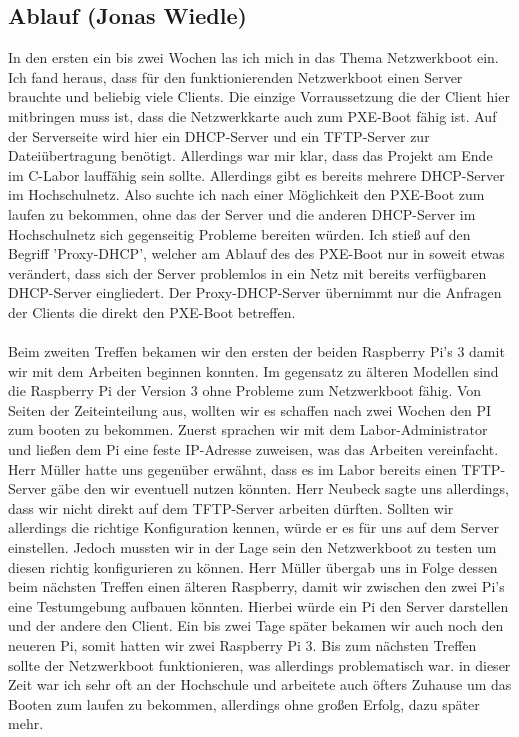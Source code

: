 \documentclass{article}
\begin{document}
\subsection{Ablauf (Jonas Wiedle)}
In den ersten ein bis zwei Wochen las ich mich in das Thema Netzwerkboot ein. Ich fand heraus, dass für den funktionierenden Netzwerkboot einen Server brauchte und beliebig viele Clients. Die einzige Vorraussetzung die der Client hier mitbringen muss ist, dass die Netzwerkkarte auch zum PXE-Boot fähig ist.
Auf der Serverseite wird hier ein DHCP-Server und ein TFTP-Server zur Dateiübertragung benötigt. Allerdings war mir klar, dass das Projekt am Ende im C-Labor lauffähig sein sollte. Allerdings gibt es bereits mehrere DHCP-Server im Hochschulnetz. Also suchte ich nach einer Möglichkeit den PXE-Boot zum laufen zu bekommen, ohne das der Server und die anderen DHCP-Server im Hochschulnetz sich gegenseitig Probleme bereiten würden. Ich stieß auf den Begriff  'Proxy-DHCP', welcher am Ablauf des des PXE-Boot nur in soweit etwas verändert, dass sich der Server problemlos in ein Netz mit bereits verfügbaren DHCP-Server eingliedert. Der Proxy-DHCP-Server übernimmt nur die Anfragen der Clients die direkt den PXE-Boot betreffen. 
\\\\
Beim zweiten Treffen bekamen wir den ersten der beiden Raspberry Pi's 3 damit wir mit dem Arbeiten beginnen konnten. Im gegensatz zu älteren Modellen sind die Raspberry Pi der Version 3 ohne Probleme zum Netzwerkboot fähig. Von Seiten der Zeiteinteilung aus, wollten wir es schaffen nach zwei Wochen den PI zum booten zu bekommen.
Zuerst sprachen wir mit dem Labor-Administrator und ließen dem Pi eine feste IP-Adresse zuweisen, was das Arbeiten vereinfacht. Herr Müller hatte uns gegenüber erwähnt, dass es im Labor bereits einen TFTP-Server gäbe den wir eventuell nutzen könnten. Herr Neubeck sagte uns allerdings, dass wir nicht direkt auf dem TFTP-Server arbeiten dürften.
Sollten wir allerdings die richtige Konfiguration kennen, würde er es für uns auf dem Server einstellen.
Jedoch mussten wir in der Lage sein den Netzwerkboot zu testen um diesen richtig konfigurieren zu können. Herr Müller übergab uns in Folge dessen beim nächsten Treffen einen älteren Raspberry, damit wir zwischen den zwei Pi's eine Testumgebung aufbauen könnten. Hierbei würde ein Pi den Server darstellen und der andere den Client.
Ein bis zwei Tage später bekamen wir auch noch den neueren Pi, somit hatten wir zwei Raspberry Pi 3. Bis zum nächsten Treffen sollte der Netzwerkboot funktionieren, was allerdings problematisch war. in dieser Zeit war ich sehr oft an der Hochschule und arbeitete auch öfters Zuhause um das Booten zum laufen zu bekommen, allerdings ohne großen Erfolg, dazu später mehr.
\end{document}
